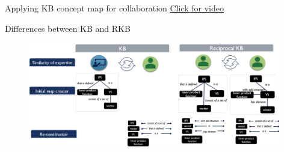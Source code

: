         


\begin{frame}{Applying KB concept map for collaboration}
\href{run:/path/nameofvideo.mp4}{\underline{Click for video}}
\end{frame}

\begin{frame}{Differences between KB and RKB}
    \begin{figure}[tb]
        \begin{center}
            \includegraphics[width=110mm]{images/kb_rkb.pdf}
        \end{center}
        \label{intro::kb_rkb}
    \end{figure}
\end{frame}

